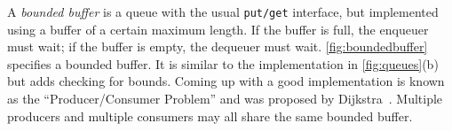 \documentclass{report}
\newcommand{\harmonylink}[1]{%
[\href{https://harmony.cs.cornell.edu/#1}{\underline{#1}}]%
}
\newenvironment{code}{
\tcolorbox
}{
\endtcolorbox
}
\begin{document}
{

A \emph{bounded buffer} is
a queue with the usual \texttt{put/get} interface,
but implemented using a buffer
of a certain maximum length.
If the buffer is full, the enqueuer must wait; if the buffer is empty, the
dequeuer must wait.
\autoref{fig:boundedbuffer} specifies a bounded buffer.
It is similar to the implementation in \autoref{fig:queues}(b) but adds
checking for bounds.
Coming up with a good implementation is known as the
``Producer/Consumer Problem'' and was
proposed by Dijkstra~\cite{EWD329}.
Multiple producers and multiple consumers may all share
the same bounded buffer.

}
\end{document}
